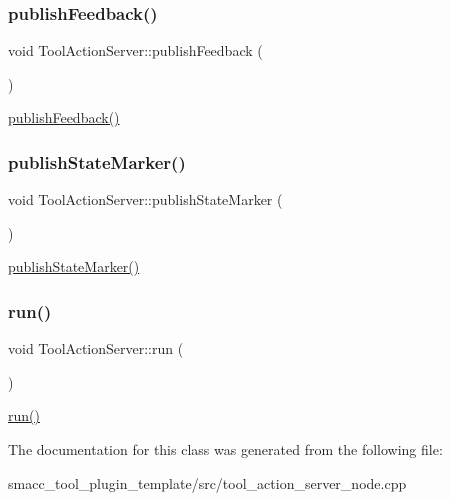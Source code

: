 \subsubsection{\texorpdfstring{publish\+Feedback()}{publishFeedback()}}
{\footnotesize\ttfamily void Tool\+Action\+Server\+::publish\+Feedback (\begin{DoxyParamCaption}{ }\end{DoxyParamCaption})\hspace{0.3cm}{\ttfamily [inline]}}

\hyperlink{classToolActionServer_afe566312095ca250bc32f98a11774f2b}{publish\+Feedback()} \mbox{\label{classToolActionServer_aef01c70e358c933855db3a37b46a3740}} 
\subsubsection{\texorpdfstring{publish\+State\+Marker()}{publishStateMarker()}}
{\footnotesize\ttfamily void Tool\+Action\+Server\+::publish\+State\+Marker (\begin{DoxyParamCaption}{ }\end{DoxyParamCaption})\hspace{0.3cm}{\ttfamily [inline]}}

\hyperlink{classToolActionServer_aef01c70e358c933855db3a37b46a3740}{publish\+State\+Marker()} \mbox{\label{classToolActionServer_adbf39061e0f8c74352cbdc695d7d8469}} 
\subsubsection{\texorpdfstring{run()}{run()}}
{\footnotesize\ttfamily void Tool\+Action\+Server\+::run (\begin{DoxyParamCaption}{ }\end{DoxyParamCaption})\hspace{0.3cm}{\ttfamily [inline]}}

\hyperlink{classToolActionServer_adbf39061e0f8c74352cbdc695d7d8469}{run()} 

The documentation for this class was generated from the following file\+:\begin{DoxyCompactItemize}
\item 
smacc\+\_\+tool\+\_\+plugin\+\_\+template/src/tool\+\_\+action\+\_\+server\+\_\+node.\+cpp\end{DoxyCompactItemize}
